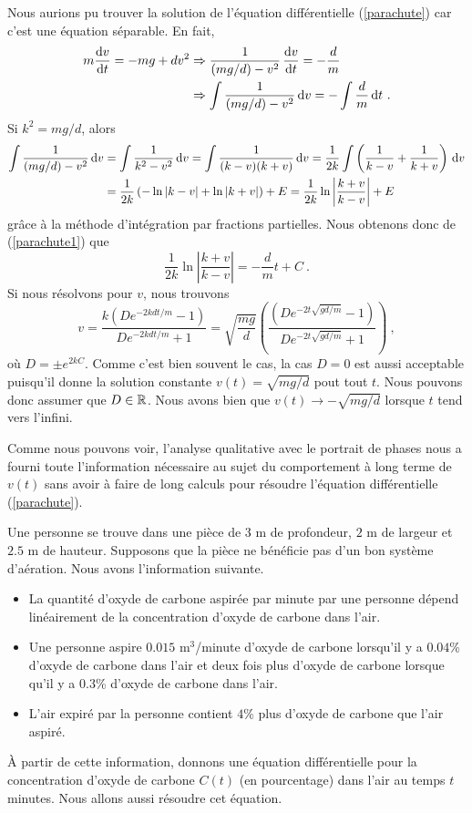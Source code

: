 {\begin{egg}[\eng]
Nous aurions pu trouver la solution de l'équation différentielle
(\ref{parachute}) car c'est une équation séparable.  En fait,
\begin{align}
m \frac{\mathrm{d}v}{\mathrm{d}t} = - m g + d v^2
&\Rightarrow
\frac{1}{\left(mg/d\right) - v^2}\, \frac{\mathrm{d}v}{\mathrm{d}t} = -\frac{d}{m}
\nonumber \\
& \Rightarrow \int \frac{1}{\left(mg/d\right) - v^2}\,\mathrm{d}v = 
  -\int \frac{d}{m} \,\mathrm{d}t \ .  \label{parachute1}
\end{align}
Si $k^2 = mg/d$, alors
\begin{align*}
\int \frac{1}{\left(mg/d\right) - v^2}\,\mathrm{d}v
&= \int \frac{1}{k^2 - v^2}\,\mathrm{d}v
= \int \frac{1}{(k - v)(k+v)}\,\mathrm{d}v
= \frac{1}{2k} \int \left( \frac{1}{k-v} + \frac{1}{k+v}\right)\,\mathrm{d}v \\
&= \frac{1}{2k} \left( -\ln|k-v| + \ln|k+v| \right) + E
= \frac{1}{2k} \ln\left| \frac{k+v}{k-v} \right| + E
\end{align*}
grâce à la méthode d'intégration par fractions partielles.  Nous
obtenons donc de (\ref{parachute1}) que
\[
  \frac{1}{2k} \ln\left| \frac{k+v}{k-v} \right| = -\frac{d}{m} t + C \ .
\]
Si nous résolvons pour $v$, nous trouvons
\[
v = \frac{ k(D e^{-2 k d t/m} -1)}{De^{-2 k d t/m} +1}
= \sqrt{\frac{mg}{d}} \left(
\frac{(D e^{-2 t \sqrt{g d/m}} -1)}{De^{-2 t\sqrt{g d/m}} +1}\right) \ ,
\]
où $D = \pm e^{2kC}$.  Comme c'est bien souvent le cas, la cas $D=0$
est aussi acceptable puisqu'il donne la solution constante
$v(t) = \sqrt{mg/d}$ pout tout $t$.  Nous pouvons donc assumer que
$D \in \mathbb{R}$.  Nous avons 
bien que $v(t) \to \displaystyle - \sqrt{mg/d}$ lorsque $t$
tend vers l'infini.

Comme nous pouvons voir, l'analyse qualitative avec le portrait de phases
nous a fourni toute l'information nécessaire au sujet du comportement
à long terme de $v(t)$ sans avoir à faire de long calculs pour résoudre
l'équation différentielle (\ref{parachute}).
\end{egg}

\begin{egg}[\eng]
Une personne se trouve dans une pièce de $3$ m de profondeur, $2$ m de
largeur et $2.5$ m de hauteur.  Supposons que la pièce ne bénéficie
pas d'un bon système d'aération.  Nous avons l'information suivante.
\begin{itemize}
\item La quantité d'oxyde de carbone aspirée par minute par une
  personne dépend linéairement de la concentration d'oxyde de carbone
  dans l'air.
\item Une personne aspire $0.015$ m$^3$/minute d'oxyde de carbone
  lorsqu'il y a $0.04$\% d'oxyde de carbone dans l'air et deux fois
  plus d'oxyde de carbone lorsque qu'il y a $0.3$\% d'oxyde de carbone
  dans l'air.
\item L'air expiré par la personne contient $4$\% plus d'oxyde de
  carbone que l'air aspiré.
\end{itemize}
À partir de cette information, donnons une équation différentielle
pour la concentration d'oxyde de carbone $C(t)$ (en pourcentage) dans
l'air au temps $t$ minutes.  Nous allons aussi résoudre cet équation.


\end{egg}}
